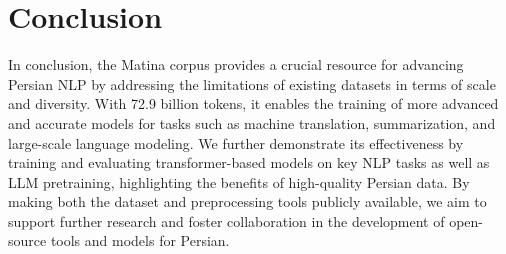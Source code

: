 \section{Conclusion}

In conclusion, the Matina corpus provides a crucial resource for advancing Persian NLP by addressing the limitations of existing datasets in terms of scale and diversity. With 72.9 billion tokens, it enables the training of more advanced and accurate models for tasks such as machine translation, summarization, and large-scale language modeling. We further demonstrate its effectiveness by training and evaluating transformer-based models on key NLP tasks as well as LLM pretraining, highlighting the benefits of high-quality Persian data. By making both the dataset and preprocessing tools publicly available, we aim to support further research and foster collaboration in the development of open-source tools and models for Persian.